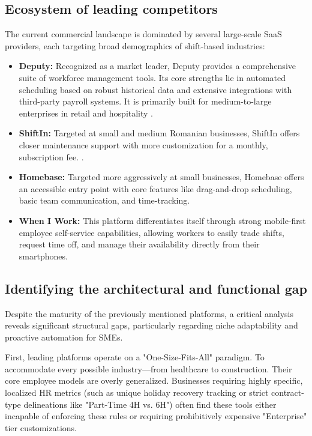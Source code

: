 \subsection{Ecosystem of leading competitors}

The current commercial landscape is dominated by several large-scale SaaS providers, each targeting broad demographics of shift-based industries:

\begin{itemize}
    \item \textbf{Deputy:} Recognized as a market leader, Deputy provides a comprehensive suite of workforce management tools. Its core strengths lie in automated scheduling based on robust historical data and extensive integrations with third-party payroll systems. It is primarily built for medium-to-large enterprises in retail and hospitality \cite{Deputy}.
    
    \item \textbf{ShiftIn:} Targeted at small and medium Romanian businesses, ShiftIn offers closer maintenance support with more customization for a monthly, subscription fee. \cite{ShiftIn}.

    \item \textbf {Homebase:} Targeted more aggressively at small businesses, Homebase offers an accessible entry point with core features like drag-and-drop scheduling, basic team communication, and time-tracking. \cite{Homebase}
    
    \item \textbf{When I Work:} This platform differentiates itself through strong mobile-first employee self-service capabilities, allowing workers to easily trade shifts, request time off, and manage their availability directly from their smartphones. \cite{WhenIWork}

    
\end{itemize}

\subsection{Identifying the architectural and functional gap}

Despite the maturity of the previously mentioned platforms, a critical analysis reveals significant structural gaps, particularly regarding niche adaptability and proactive automation for SMEs.

First, leading platforms operate on a "One-Size-Fits-All" paradigm. To accommodate every possible industry—from healthcare to construction. Their core employee models are overly generalized. Businesses requiring highly specific, localized HR metrics (such as unique holiday recovery tracking or strict contract-type delineations like "Part-Time 4H vs. 6H") often find these tools either incapable of enforcing these rules or requiring prohibitively expensive "Enterprise" tier customizations.


